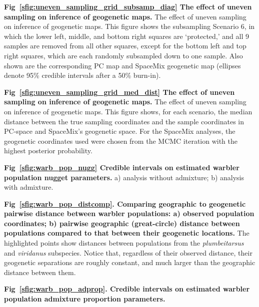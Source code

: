 \documentclass[10pt,letterpaper]{article}
\begin{document}
\label{sfig:uneven_sampling_grid_subsamp_diag}
{\bf{Fig\ \ref{sfig:uneven_sampling_grid_subsamp_diag}}
	The effect of uneven sampling on inference of geogenetic maps.}
	The effect of uneven sampling on inference of geogenetic maps.  
	This figure shows the subsampling Scenario 6, 
	in which the lower left, middle, and bottom right squares are `protected,'
	and all 9 samples are removed from all other squares, 
	except for the bottom left and top right squares, which are each 
	randomly subsampled down to one sample.
	Also shown are the corresponding PC map and 
	SpaceMix geogenetic map 
	(ellipses denote 95\% credible intervals after a 50\% burn-in).
			
\label{sfig:uneven_sampling_grid_med_dist}
{\bf{Fig\ \ref{sfig:uneven_sampling_grid_med_dist}}
	The effect of uneven sampling on inference of geogenetic maps.}
	The effect of uneven sampling on inference of geogenetic maps.  
	This figure shows, for each scenario, the median distance 
	between the true sampling coordinates and the sample coordinates 
	in PC-space and SpaceMix's geogenetic space.  For the SpaceMix 
	analyses, the geogenetic coordinates used were chosen from the 
	MCMC iteration with the highest posterior probability.

\label{warb_pop_nugg}
{\bf{Fig\ \ref{sfig:warb_pop_nugg} Credible intervals on estimated warbler population nugget parameters.}} a) analysis without admixture; b) analysis with admixture.

\label{warb_pop_distcomp}
{\bf{Fig\ \ref{sfig:warb_pop_distcomp}. Comparing geographic to geogenetic pairwise distance between warbler populations: a) observed population coordinates; b) pairwise geographic (great-circle) distance between populations compared to that between their geogenetic locations.}} The highlighted points show distances between populations from the \textit{plumbeitarsus} and \textit{viridanus} subspecies.  Notice that, regardless of their observed distance, their geogenetic separations are roughly constant, and much larger than the geographic distance between them.

\label{warb_pop_adprop}
{\bf{Fig\ \ref{sfig:warb_pop_adprop}. Credible intervals on estimated warbler population admixture proportion parameters.}}
\end{document}

